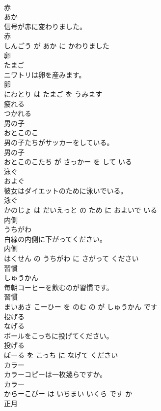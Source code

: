 \documentclass[8pt]{extreport}
\begin{document}
\begin{CJK}{UTF8}{min}
\\	赤	
\\	あか			
\\	信号が赤に変わりました。	
\\	赤 
\\	しんごう が あか に かわりました			
\\	卵	
\\	たまご			
\\	ニワトリは卵を産みます。	
\\	卵 
\\	にわとり は たまご を うみます			
\\	疲れる	
\\	つかれる			
\\	男の子	
\\	おとこのこ			
\\	男の子たちがサッカーをしている。	
\\	男の子 
\\	おとこのこたち が さっかー を して いる			
\\	泳ぐ	
\\	およぐ			
\\	彼女はダイエットのために泳いでいる。	
\\	泳ぐ 
\\	かのじょ は だいえっと の ため に およいで いる			
\\	内側	
\\	うちがわ			
\\	白線の内側に下がってください。	
\\	内側 
\\	はくせん の うちがわ に さがって ください			
\\	習慣	
\\	しゅうかん			
\\	毎朝コーヒーを飲むのが習慣です。	
\\	習慣 
\\	まいあさ こーひー を のむ の が しゅうかん です			
\\	投げる	
\\	なげる			
\\	ボールをこっちに投げてください。	
\\	投げる 
\\	ぼーる を こっち に なげて ください			
\\	カラー	
\\	カラーコピーは一枚幾らですか。	
\\	カラー 
\\	からーこぴー は いちまい いくら です か			
\\	正月	

\end{CJK}
\end{document}
